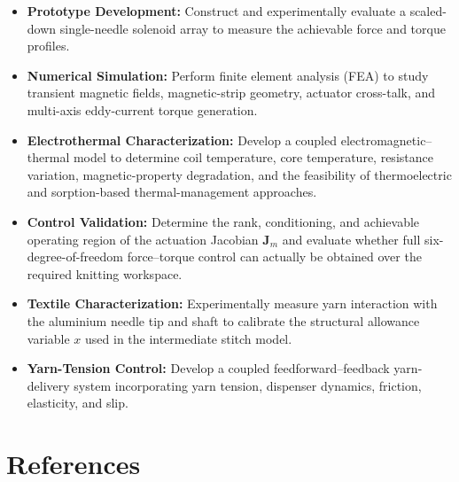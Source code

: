 \documentclass[12pt, a4paper]{article}
\begin{document}
\begin{itemize}

\item \textbf{Prototype Development:} Construct and experimentally evaluate a scaled-down single-needle solenoid array to measure the achievable force and torque profiles.

\item \textbf{Numerical Simulation:} Perform finite element analysis (FEA) to study transient magnetic fields, magnetic-strip geometry, actuator cross-talk, and multi-axis eddy-current torque generation.

\item \textbf{Electrothermal Characterization:} Develop a coupled electromagnetic--thermal model to determine coil temperature, core temperature, resistance variation, magnetic-property degradation, and the feasibility of thermoelectric and sorption-based thermal-management approaches.

\item \textbf{Control Validation:} Determine the rank, conditioning, and achievable operating region of the actuation Jacobian $\mathbf{J}_m$ and evaluate whether full six-degree-of-freedom force--torque control can actually be obtained over the required knitting workspace.

\item \textbf{Textile Characterization:} Experimentally measure yarn interaction with the aluminium needle tip and shaft to calibrate the structural allowance variable $x$ used in the intermediate stitch model.

\item \textbf{Yarn-Tension Control:} Develop a coupled feedforward--feedback yarn-delivery system incorporating yarn tension, dispenser dynamics, friction, elasticity, and slip.

\end{itemize}

\section*{References}
\end{document}
